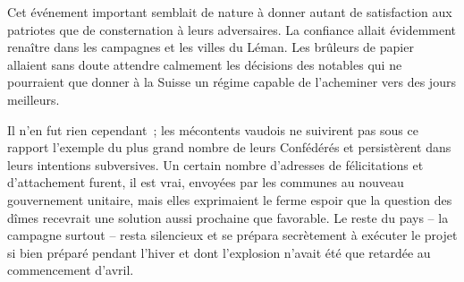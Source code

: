 \documentclass[french,twoside]{book} %
\begin{document}
Cet événement important semblait de nature à donner autant de satisfaction aux patriotes que de consternation à leurs adversaires. La confiance allait évidemment renaître dans les campagnes et les villes du Léman. Les brûleurs de papier allaient sans doute attendre calmement les décisions des notables qui ne pourraient que donner à la Suisse un régime capable de l’acheminer vers des jours meilleurs.\par
Il n’en fut rien cependant ; les mécontents vaudois ne suivirent pas sous ce rapport l’exemple du plus grand nombre de leurs Confédérés et persistèrent dans leurs intentions subversives. Un certain nombre d’adresses de félicitations et d’attachement furent, il est vrai, envoyées par les communes au nouveau gouvernement unitaire, mais elles exprimaient le ferme espoir que la question des dîmes recevrait une solution aussi prochaine que favorable. Le reste du pays – la campagne surtout – resta silencieux et se prépara secrètement à exécuter le projet si bien préparé pendant l’hiver et dont l’explosion n’avait été que retardée au commencement d’avril.\par
\end{document}
